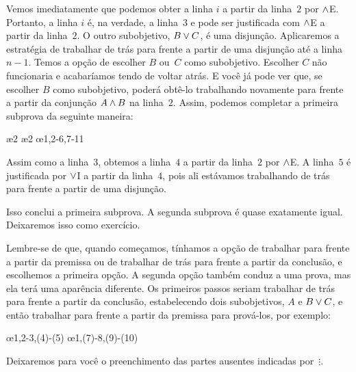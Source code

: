 Vemos imediatamente que podemos obter a linha $i$ a partir da linha~$2$ por $\wedge$E. Portanto, a linha $i$ é, na verdade, a linha~$3$ e pode ser justificada com $\wedge$E a partir da linha~$2$. O outro subobjetivo, $B \vee C$, é uma disjunção. Aplicaremos a estratégia de trabalhar de trás para frente a partir de uma disjunção até a linha $n-1$. Temos a opção de escolher $B$ ou~$C$ como subobjetivo. Escolher $C$ não funcionaria e acabaríamos tendo de voltar atrás. E você já pode ver que, se escolher $B$ como subobjetivo, poderá obtê-lo trabalhando novamente para frente a partir da conjunção $A \wedge B$ na linha~$2$. Assim, podemos completar a primeira subprova da seguinte maneira:
\begin{fitchproof}
	\PR
	\open
	\AS
	\ae{2}
	\ae{2}
	\close
	\open
	\AS
	\ellipsesline
	\close
	\oe{1,2-6,7-11}
\end{fitchproof}
Assim como a linha~$3$, obtemos a linha~$4$ a partir da linha~$2$ por $\wedge$E. A linha~$5$ é justificada por $\vee$I a partir da linha~$4$, pois ali estávamos trabalhando de trás para frente a partir de uma disjunção.

Isso conclui a primeira subprova. A segunda subprova é quase exatamente igual. Deixaremos isso como exercício.

Lembre-se de que, quando começamos, tínhamos a opção de trabalhar para frente a partir da premissa ou de trabalhar de trás para frente a partir da conclusão, e escolhemos a primeira opção. A segunda opção também conduz a uma prova, mas ela terá uma aparência diferente. Os primeiros passos seriam trabalhar de trás para frente a partir da conclusão, estabelecendo dois subobjetivos, $A$ e $B \vee C$, e então trabalhar para frente a partir da premissa para prová-los, por exemplo:
\begin{fitchproof}
	\PR
	\open
	\AS
	\ellipsesline
	\close
	\open
	\AS
	\ellipsesline
	\close
	\oe{1,2-3,(4)-(5)}
	\open
	\AS
	\ellipsesline
	\close
	\open
	\AS
	\ellipsesline
	\close
	\oe{1,(7)-8,(9)-(10)}	
\end{fitchproof}
Deixaremos para você o preenchimento das partes ausentes indicadas por~$\vdots$.

